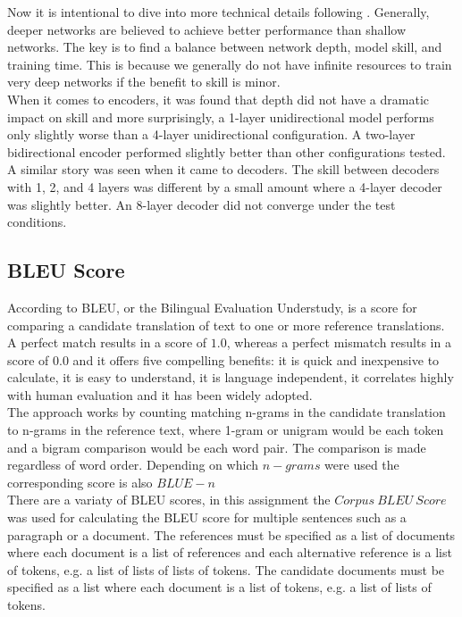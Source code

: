 ﻿\documentclass[conference]{IEEEtran}
\begin{document}
Now it is intentional to dive into more technical details following \cite{configure}. Generally, deeper networks are believed to achieve better performance than shallow networks. The key is to find a balance between network depth, model skill, and training time. This is because we generally do not have infinite resources to train very deep networks if the benefit to skill is minor.\\
When it comes to encoders, it was found that depth did not have a dramatic impact on skill and more surprisingly, a 1-layer unidirectional model performs only slightly worse than a 4-layer unidirectional configuration. A two-layer bidirectional encoder performed slightly better than other configurations tested.\\
A similar story was seen when it came to decoders. The skill between decoders with 1, 2, and 4 layers was different by a small amount where a 4-layer decoder was slightly better. An 8-layer decoder did not converge under the test conditions.



\subsection{BLEU Score}

According to \cite{bleu} BLEU, or the Bilingual Evaluation Understudy, is a score for comparing a candidate translation of text to one or more reference translations. A perfect match results in a score of $1.0$, whereas a perfect mismatch results in a score of $ 0.0$ and it offers five compelling benefits: it is quick and inexpensive to calculate, it is easy to understand, it is language independent, it correlates highly with human evaluation and it has been widely adopted.\\
The approach works by counting matching n-grams in the candidate translation to n-grams in the reference text, where 1-gram or unigram would be each token and a bigram comparison would be each word pair. The comparison is made regardless of word order. Depending on which $n-grams$ were used the corresponding score is also $BLUE-n$\\

There are a variaty of BLEU scores, in this assignment the $Corpus \ BLEU \ Score$ was used for calculating the BLEU score for multiple sentences such as a paragraph or a document. The references must be specified as a list of documents where each document is a list of references and each alternative reference is a list of tokens, e.g. a list of lists of lists of tokens. The candidate documents must be specified as a list where each document is a list of tokens, e.g. a list of lists of tokens.\\
\end{document}
